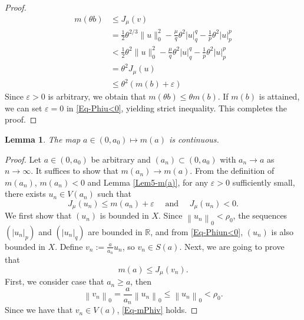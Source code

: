 \documentclass[11pt]{amsart}
\newtheorem{lemma}[theorem]{Lemma}
\numberwithin{equation}{section}
\begin{document}
{{\begin{proof}
{   $$
    \begin{aligned}
        m(\theta b) & \leq J_\mu(v)\\
        &=\frac{1}{2} \theta^{2/3}\|u\|_0^2-\frac{\mu}{q} \theta^{2}|u|_q^q-\frac{1}{p} \theta^{2}|u|_{p}^{p} \\
        & <\frac{1}{2} \theta^{2}\|u\|_0^2-\frac{\mu}{q} \theta^{2}|u|_q^q-\frac{1}{p} \theta^{2}|u|_{p}^{p}\\
        &=\theta^{2} J_\mu(u)\\
        & \leq \theta^2(m(b)+\varepsilon)
    \end{aligned}
    $$}
    Since $\varepsilon>0$ is arbitrary, we obtain that $m(\theta b) \leq \theta m(b)$. {If $m(b)$ is attained,  we can set $\varepsilon=0$ in \eqref{Eq-Phiu<0}, yielding strict inequality. This completes the proof.}
    \end{proof}
    \begin{lemma}\label{Lem4-m(a)cont}
    {   The map $a \in (0, a_0) \mapsto m(a)$ is continuous.}
    \end{lemma}
    \begin{proof}
        Let $a \in\left(0, a_0\right)$ be arbitrary and $\left(a_n\right) \subset\left(0, a_0\right)$ with $a_n \rightarrow a$ as $n\rightarrow\infty$.
        It suffices to show that
        $m\left(a_n\right) \rightarrow m(a)$.
        {From the definition of $m\left(a_n\right)$, $m\left(a_n\right)<0$ and Lemma \ref{Lem5-m(a)},} for any $\varepsilon>0$ sufficiently small, there exists $u_n \in V\left(a_n\right)$ such that
        \begin{equation}\label{Eq-Phiun<0}
            J_\mu\left(u_n\right) \leq m\left(a_n\right)+\varepsilon \quad \text { and } \quad J_\mu\left(u_n\right)<0.
        \end{equation}
        {We first show that $(u_n)$ is bounded in $X$. Since $\left\| u_n\right\|_{0}<\rho_0$, the sequences {$(\left|u_n\right|_p)$ and $(\left|u_n\right|_{q})$  are bounded  in $\mathbb{R}$,} and from \eqref{Eq-Phiun<0},  $(u_n)$ is also bounded in $X$. Define $v_n:={\frac{a}{a_n}} u_n$, so $v_n \in {S}(a)$. Next, we are going to prove that}
        \begin{equation}\label{Eq-mPhiv}
            m(a) \leq J_\mu\left(v_n\right).
        \end{equation}
        First, we consider case that $a_n \geq a$, then
        \begin{equation}
            \left\| v_n\right\|_{0}=\frac{a}{a_n}\left\| u_n\right\|_{0} \leq\left\| u_n\right\|_{0}<\rho_0.
        \end{equation}
        Since we have that $v_n \in V(a)$, \eqref{Eq-mPhiv} holds.



\end{proof}}}
\end{document}
